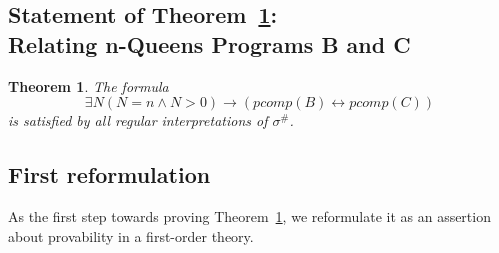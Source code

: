 \documentclass[11pt]{article}
\newtheorem{theorem}{Theorem}
\def\lrar{\leftrightarrow}
\def\beq{\begin{equation}}
\def\eeq#1{\label{#1}\end{equation}}
\begin{document}
\begin{adjustwidth}{-1cm}{-1cm}
\section{Statement of Theorem~\ref{thm:bc}:\\ Relating n-Queens Programs B and C}

\begin{theorem}\label{thm:bc}
The formula
\beq
\exists N(N=n\land N>0) %
\to (\mathit{pcomp}(B)\lrar\mathit{pcomp}(C))
\eeq{eq:thm:bc}
is satisfied by all regular interpretations of $\sigma^\#$.
\end{theorem}


\subsection{First reformulation}



As the first step towards proving Theorem~\ref{thm:bc}, we reformulate it
as an assertion about provability in a first-order theory.


\end{adjustwidth}
\end{document}
